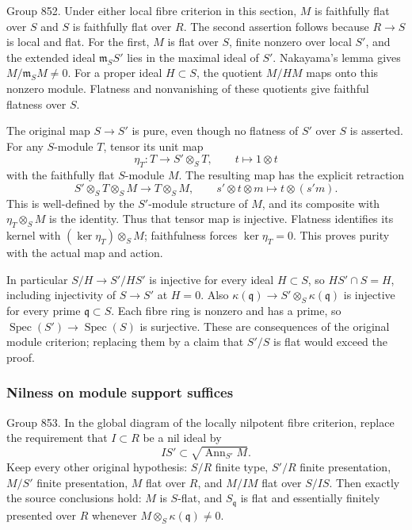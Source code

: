 Group 852. Under either local fibre criterion in this section, \(M\) is faithfully flat over \(S\) and \(S\) is faithfully flat over \(R\). The second assertion follows because \(R\to S\) is local and flat. For the first, \(M\) is flat over \(S\), finite nonzero over local \(S'\), and the extended ideal \(\mathfrak m_SS'\) lies in the maximal ideal of \(S'\). Nakayama's lemma gives \(M/\mathfrak m_SM\ne0\). For a proper ideal \(H\subset S\), the quotient \(M/HM\) maps onto this nonzero module. Flatness and nonvanishing of these quotients give faithful flatness over \(S\).

The original map \(S\to S'\) is pure, even though no flatness of \(S'\) over \(S\) is asserted. For any \(S\)-module \(T\), tensor its unit map \[
\eta_T:T\longrightarrow S'\otimes_S T,\qquad t\longmapsto1\otimes t
\] with the faithfully flat \(S\)-module \(M\). The resulting map has the explicit retraction \[
S'\otimes_S T\otimes_S M\longrightarrow T\otimes_S M,\qquad
s'\otimes t\otimes m\longmapsto t\otimes(s'm).
\] This is well-defined by the \(S'\)-module structure of \(M\), and its composite with \(\eta_T\otimes_S M\) is the identity. Thus that tensor map is injective. Flatness identifies its kernel with \((\ker\eta_T)\otimes_S M\); faithfulness forces \(\ker\eta_T=0\). This proves purity with the actual map and action.

In particular \(S/H\to S'/HS'\) is injective for every ideal \(H\subset S\), so \(HS'\cap S=H\), including injectivity of \(S\to S'\) at \(H=0\). Also \(\kappa(\mathfrak q)\to S'\otimes_S\kappa(\mathfrak q)\) is injective for every prime \(\mathfrak q\subset S\). Each fibre ring is nonzero and has a prime, so \(\operatorname{Spec}(S')\to\operatorname{Spec}(S)\) is surjective. These are consequences of the original module criterion; replacing them by a claim that \(S'/S\) is flat would exceed the proof.

\subsubsection{Nilness on module support suffices}\label{algebra-proof-038-nilness-on-module-support-suffices}

Group 853. In the global diagram of the locally nilpotent fibre criterion, replace the requirement that \(I\subset R\) be a nil ideal by \[
IS'\subset\sqrt{\operatorname{Ann}_{S'}M}.
\] Keep every other original hypothesis: \(S/R\) finite type, \(S'/R\) finite presentation, \(M/S'\) finite presentation, \(M\) flat over \(R\), and \(M/IM\) flat over \(S/IS\). Then exactly the source conclusions hold: \(M\) is \(S\)-flat, and \(S_{\mathfrak q}\) is flat and essentially finitely presented over \(R\) whenever \(M\otimes_S\kappa(\mathfrak q)\ne0\).

